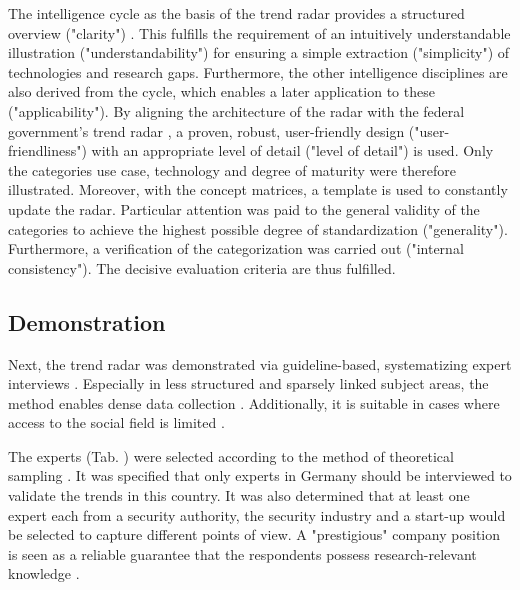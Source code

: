 \documentclass[10pt]{article}
\begin{document}
The intelligence cycle as the basis of the trend radar provides a
structured overview ("clarity") \cite{Breakspear.2013}. This
fulfills the requirement of an intuitively understandable illustration
("understandability") for ensuring a simple extraction ("simplicity")
of technologies and research gaps. Furthermore, the other intelligence
disciplines are also derived from the cycle, which enables a later
application to these ("applicability"). By aligning the
architecture of the radar with the federal government's trend radar
\cite{Stich.2022}, a proven, robust, user-friendly
design ("user-friendliness") with an appropriate level of detail
("level of detail") is used. Only the categories use case, technology and
degree of maturity were therefore illustrated. Moreover, with the concept matrices, a
template is used to constantly update the radar. Particular attention
was paid to the general validity of the categories to achieve
the highest possible degree of standardization ("generality").
Furthermore, a verification of the categorization was carried out ("internal consistency").
The decisive evaluation criteria \cite{vomBrocke.2020b} are thus fulfilled.

\subsection{Demonstration}

Next, the trend radar was demonstrated via guideline-based,
systematizing expert interviews \cite{Bogner.2014, Glaser.2009, Meuser.1991}.
Especially in less structured and sparsely linked subject areas, the method
enables dense data collection \cite{Bogner.2014,Meuser.1991}. Additionally,
it is suitable in cases where access to the social field is limited \cite{Bogner.2002c, Glaser.2009}.

The experts (Tab. ) were selected according to the method of
theoretical sampling \cite{Glaser.1967,Eisenhardt.1989}. It was specified that only experts in
Germany should be interviewed to validate the trends in this
country. It was also determined that at least one expert each
from a security authority, the security industry and a
start-up would be selected to capture different points of
view. A "prestigious" company position is seen as a reliable
guarantee that the respondents possess research-relevant knowledge \cite{Bogner.2002b}.
\end{document}
